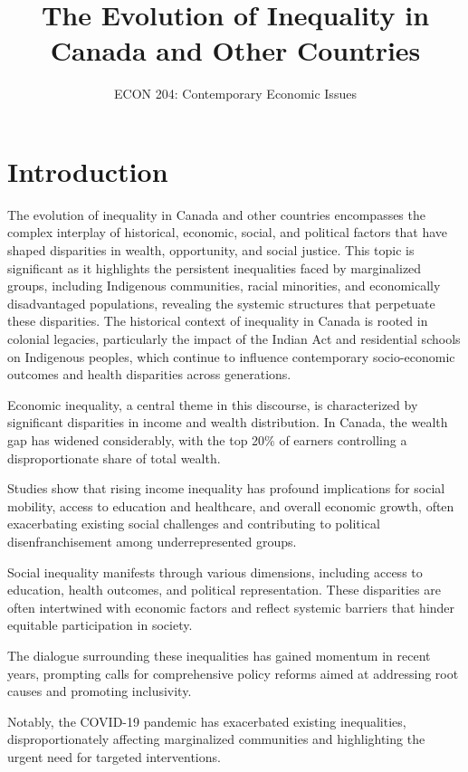 \documentclass[12pt]{article}
\title{The Evolution of Inequality in Canada and Other Countries}
\author{ECON 204: Contemporary Economic Issues}
\date{}
\begin{document}
\maketitle

\section*{Introduction}

The evolution of inequality in Canada and other countries encompasses the complex interplay of historical, economic, social, and political factors that have shaped disparities in wealth, opportunity, and social justice. This topic is significant as it highlights the persistent inequalities faced by marginalized groups, including Indigenous communities, racial minorities, and economically disadvantaged populations, revealing the systemic structures that perpetuate these disparities. The historical context of inequality in Canada is rooted in colonial legacies, particularly the impact of the Indian Act and residential schools on Indigenous peoples, which continue to influence contemporary socio-economic outcomes and health disparities across generations.

Economic inequality, a central theme in this discourse, is characterized by significant disparities in income and wealth distribution. In Canada, the wealth gap has widened considerably, with the top 20\% of earners controlling a disproportionate share of total wealth.

Studies show that rising income inequality has profound implications for social mobility, access to education and healthcare, and overall economic growth, often exacerbating existing social challenges and contributing to political disenfranchisement among underrepresented groups.

Social inequality manifests through various dimensions, including access to education, health outcomes, and political representation. These disparities are often intertwined with economic factors and reflect systemic barriers that hinder equitable participation in society.

The dialogue surrounding these inequalities has gained momentum in recent years, prompting calls for comprehensive policy reforms aimed at addressing root causes and promoting inclusivity.

Notably, the COVID-19 pandemic has exacerbated existing inequalities, disproportionately affecting marginalized communities and highlighting the urgent need for targeted interventions.
\end{document}
